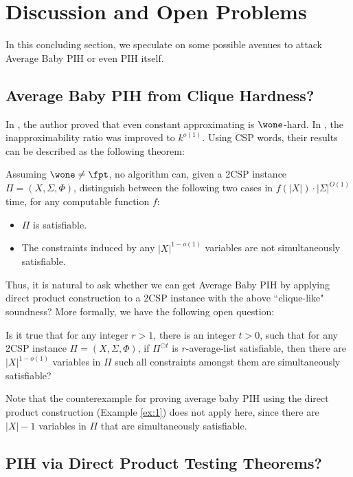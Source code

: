 \section{Discussion and Open Problems}
\label{sec:discuss}

In this concluding section, we speculate on some possible avenues to attack Average Baby PIH or even PIH itself.

\subsection{Average Baby PIH from Clique Hardness?}

In \cite{Lin21}, the author proved that even constant approximating \kclique{} is $\wone$-hard. In \cite{KK22,CFL+23}, the inapproximability ratio was improved to $k^{o(1)}$. Using CSP words, their results can be described as the following theorem:

\begin{theorem}
    Assuming $\wone\neq\fpt$, no algorithm can, given a 2CSP instance $\Pi=(X,\Sigma,\Phi)$, distinguish between the following two cases in $f(|X|)\cdot |\Sigma|^{O(1)}$ time, for any computable function $f$:
    \begin{itemize}
        \item $\Pi$ is satisfiable.
        \item The constraints induced by any $|X|^{1-o(1)}$ variables are not simultaneously satisfiable.
    \end{itemize}
\end{theorem}
 Thus, it is natural to ask whether we can get Average Baby PIH by applying direct product construction to a 2CSP instance with the above ``clique-like" soundness? More formally, we have the following open question:

\begin{question}
Is it true that for any integer $r>1$, there is an integer $t>0$, such that for any 2CSP instance $\Pi=(X,\Sigma,\Phi)$, if $\Pi^{\odot t}$ is $r$-average-list satisfiable, then there are $|X|^{1-o(1)}$ variables in $\Pi$ such all constraints amongst them are simultaneously satisfiable?
\end{question}

Note that the counterexample for proving average baby PIH using the direct product construction (Example \ref{ex:1}) does not apply here, since there are $|X|-1$ variables in $\Pi$ that are simultaneously satisfiable.

\subsection{PIH via Direct Product Testing Theorems?}

